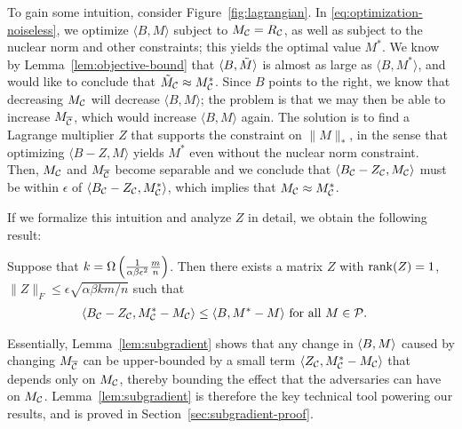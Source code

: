 To gain some intuition, consider 
Figure~\ref{fig:lagrangian}. In \eqref{eq:optimization-noiseless}, we optimize 
$\langle B, M \rangle$ subject to $M_{\mathcal{C}} = R_{\mathcal{C}}$, as well as subject to 
the nuclear norm and other constraints; this yields the optimal value $M^*$. 
We know by Lemma~\ref{lem:objective-bound} that $\langle B, \tilde{M} \rangle$ is almost 
as large as $\langle B, M^* \rangle$, and would like to conclude that 
$\tilde{M}_{\mathcal{C}} \approx M^*_{\mathcal{C}}$. Since $B$ points to the right, we know that 
decreasing $M_{\mathcal{C}}$ will decrease $\langle B, M \rangle$; the problem is that 
we may then be able to increase $M_{\overline{\mathcal{C}}}$, which would increase 
$\langle B, M \rangle$ again. The solution is to find a Lagrange 
multiplier $Z$ that supports 
the constraint on $\|M\|_*$, in the sense that optimizing 
$\langle B-Z, M \rangle$ yields $M^*$ even without the nuclear norm constraint. 
Then, $M_{\mathcal{C}}$ and $M_{\overline{\mathcal{C}}}$ become separable and we conclude that 
$\langle B_{\mathcal{C}} - Z_{\mathcal{C}}, M_{\mathcal{C}} \rangle$ must be within $\epsilon$ of 
$\langle B_{\mathcal{C}} - Z_{\mathcal{C}}, M^*_{\mathcal{C}} \rangle$, which implies that 
$M_{\mathcal{C}} \approx M^*_{\mathcal{C}}$.

If we formalize this intuition and analyze $Z$ in detail, we obtain the 
following result:
\begin{lemma}
\label{lem:subgradient}
Suppose that $k = \Omega\left( \frac{1}{\alpha\beta\epsilon^2}\frac{m}{n} \right)$. 
Then there exists a matrix $Z$ with 
$\operatorname{rank}(Z) = 1$, $\|Z\|_F \leq \epsilon \sqrt{\alpha\beta km/n}$ such that
\begin{align}
\langle B_{\mathcal{C}} - Z_{\mathcal{C}}, M^*_{\mathcal{C}} - M_{\mathcal{C}} \rangle &\leq \langle B, M^* - M \rangle \text{ for all $M \in \mathcal{P}$}.
\end{align}
\end{lemma}
Essentially, Lemma~\ref{lem:subgradient} shows that any change in 
$\langle B, M \rangle$ caused by changing $M_{\overline{\mathcal{C}}}$ can be upper-bounded 
by a small term $\langle Z_{\mathcal{C}}, M^*_{\mathcal{C}} - M_{\mathcal{C}} \rangle$ that depends only 
on $M_{\mathcal{C}}$, thereby bounding the effect that the adversaries can have 
on $M_{\mathcal{C}}$. Lemma~\ref{lem:subgradient} is therefore the key 
technical tool powering our results, and is proved in 
Section~\ref{sec:subgradient-proof}.

